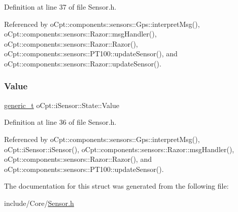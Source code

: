 Definition at line 37 of file Sensor.\+h.



Referenced by o\+Cpt\+::components\+::sensors\+::\+Gps\+::interpret\+Msg(), o\+Cpt\+::components\+::sensors\+::\+Razor\+::msg\+Handler(), o\+Cpt\+::components\+::sensors\+::\+Razor\+::\+Razor(), o\+Cpt\+::components\+::sensors\+::\+P\+T100\+::update\+Sensor(), and o\+Cpt\+::components\+::sensors\+::\+Razor\+::update\+Sensor().

\hypertarget{structo_cpt_1_1i_sensor_1_1_state_ad3994c60f8e89120291699653d5c3498}{}\label{structo_cpt_1_1i_sensor_1_1_state_ad3994c60f8e89120291699653d5c3498} 
\subsubsection{\texorpdfstring{Value}{Value}}
{\footnotesize\ttfamily \hyperlink{classo_cpt_1_1i_sensor_a8c83eafe5bdc0074a8c2c405023ee204}{generic\+\_\+t} o\+Cpt\+::i\+Sensor\+::\+State\+::\+Value}



Definition at line 36 of file Sensor.\+h.



Referenced by o\+Cpt\+::components\+::sensors\+::\+Gps\+::interpret\+Msg(), o\+Cpt\+::i\+Sensor\+::i\+Sensor(), o\+Cpt\+::components\+::sensors\+::\+Razor\+::msg\+Handler(), o\+Cpt\+::components\+::sensors\+::\+Razor\+::\+Razor(), and o\+Cpt\+::components\+::sensors\+::\+P\+T100\+::update\+Sensor().



The documentation for this struct was generated from the following file\+:\begin{DoxyCompactItemize}
\item 
include/\+Core/\hyperlink{_sensor_8h}{Sensor.\+h}\end{DoxyCompactItemize}
